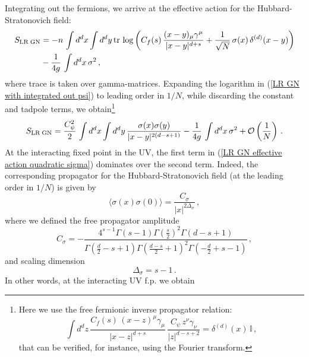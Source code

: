 \documentclass[aps,amsmath,amssymb,prd,showpacs,floatfix,preprint,superscriptaddress,nofootinbib,12pt]{article}
\begin{document}
Integrating out the fermions, we arrive at the effective action for the Hubbard-Stratonovich field:
\begin{equation}
\label{LR GN with integrated out psi}
\begin{aligned}
S_{\textrm{LR\;GN}} &= -n\,\int d^dx\int d^dy\,\textrm{tr}\,\log
\left(C_f(s)\,\frac{(x-y)_\mu\gamma^\mu}{|x-y|^{d+s}}+\frac{1}{\sqrt{N}}\,\sigma(x)\,
\delta^{(d)}(x-y)\right)\\
&-\frac{1}{4g}\,\int d^dx \,\sigma^2\,,
\end{aligned}
\end{equation}
where trace is taken over gamma-matrices.
Expanding the logarithm in (\ref{LR GN with integrated out psi}) to leading order in $1/N$,
while discarding the constant and tadpole terms, we obtain\footnote{Here we use the free fermionic
inverse propagator relation:
\begin{equation}
\int d^dz\,\frac{C_f(s)\,(x-z)^\mu\gamma_\mu}{|x-z|^{d+s}}\,\frac{C_\psi\,z^\nu\gamma_\nu}{|z|^{d-s+2}}
=\delta^{(d)}(x)\,\mathbb{I}\,,
\end{equation}
that can be verified, for instance, using the Fourier transform.}
\begin{equation}
\label{LR GN effective action quadratic sigma}
S_{\textrm{LR\;GN}} = \frac{C_\psi^2}{2}\,\int d^dx\int d^dy\,\frac{\sigma(x)\sigma(y)}
{|x-y|^{2(d-s+1)}}-\frac{1}{4g}\,\int d^dx \,\sigma^2 + {\cal O}\left(\frac{1}{N}\right)\,.
\end{equation}
At the interacting fixed point in the UV, the first term in (\ref{LR GN effective action quadratic sigma})
dominates over the second term. Indeed, the corresponding propagator for the 
Hubbard-Stratonovich field (at the leading order in $1/N$) is given by
\begin{equation}
\label{leading <sigma sigma>}
\langle\sigma(x)\sigma(0)\rangle = \frac{C_\sigma}{|x|^{2\Delta_\sigma}}\,,
\end{equation}
where we defined the free propagator amplitude
\begin{equation}
C_\sigma =-\frac{4^{s-1} \Gamma (s-1) \Gamma \left(\frac{s}{2}\right)^2 \Gamma (d-s+1)}{\Gamma \left(\frac{d}{2}-s+1\right) \Gamma \left(\frac{d-s}{2} +1\right)^2 \Gamma \left(-\frac{d}{2}+s-1\right)}\,,
\end{equation}
and scaling dimension
\begin{equation}
\label{Delta sigma}
\Delta_\sigma = s-1\,.
\end{equation}
In other words, at the interacting UV f.p. we obtain
\end{document}
